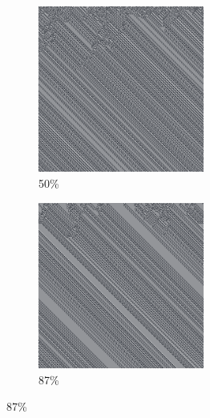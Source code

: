 \documentclass[12pt, fleqn]{report}                             %
\theoremstyle{break}                                            %
\begin{document}
\begin{figure}[ht!]
\begin{subfigure}[b]{0.4\linewidth}
          \includegraphics[width=0.6\textwidth]{Images/41/c.png}
          \caption{50\%}
        \end{subfigure}
        \begin{subfigure}[b]{0.4\linewidth}
          \includegraphics[width=0.6\textwidth]{Images/41/d.png}
          \caption{87\%}
        \end{subfigure}
      \end{figure}
\end{document}
